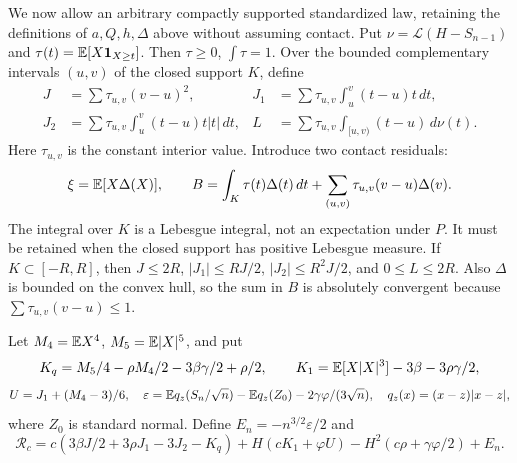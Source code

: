 We now allow an arbitrary compactly supported standardized law, retaining
the definitions of $a,Q,h,\Delta$ above without assuming contact.
Put $\nu=\mathcal L(H-S_{n-1})$ and
$\tau(t)=\mathbb E[X\mathbf1_{X\ge t}]$. Then $\tau\ge0$, $\int\tau=1$.
Over the bounded complementary intervals $(u,v)$ of the closed support
$K$, define
\begin{align*}
 J&=\sum\tau_{u,v}(v-u)^2,&
 J_1&=\sum\tau_{u,v}\int_u^v(t-u)t\,dt,\\
 J_2&=\sum\tau_{u,v}\int_u^v(t-u)t|t|\,dt,&
 L&=\sum\tau_{u,v}\int_{[u,v)}(t-u)\,d\nu(t).
\end{align*}
Here $\tau_{u,v}$ is the constant interior value. Introduce two
contact residuals:
\begin{equation}\label{v8con:residuals}
 \xi=\mathbb E[X\Delta(X)],\qquad
 B=\int_K\tau(t)\Delta(t)\,dt
       +\sum_{(u,v)}\tau_{u,v}(v-u)\Delta(v).
\end{equation}
The integral over $K$ is a Lebesgue integral, not an expectation under $P$.
It must be retained when the closed support has positive Lebesgue measure.
If $K\subset[-R,R]$, then $J\le2R$, $|J_1|\le RJ/2$,
$|J_2|\le R^2J/2$, and $0\le L\le2R$. Also $\Delta$ is bounded on
the convex hull, so the sum in $B$ is absolutely convergent because
$\sum\tau_{u,v}(v-u)\le1$.

Let $M_4=\mathbb E X^4$, $M_5=\mathbb E|X|^5$, and put
\[
 K_q=M_5/4-\rho M_4/2-3\beta\gamma/2+\rho/2,
 \qquad K_1=\mathbb E[X|X|^3]-3\beta-3\rho\gamma/2,
\]
\[
 U=J_1+(M_4-3)/6,\quad
 \varepsilon=\mathbb E q_z(S_n/\sqrt n)-\mathbb E q_z(Z_0)
                  -2\gamma\varphi/(3\sqrt n),\quad
 q_z(x)=(x-z)|x-z|,
\]
where $Z_0$ is standard normal. Define $E_n=-n^{3/2}\varepsilon/2$ and
\begin{equation}\label{v8con:R}
 \mathcal R_c=c(3\beta J/2+3\rho J_1-3J_2-K_q)
 +H(cK_1+\varphi U)-H^2(c\rho+\gamma\varphi/2)+E_n.
\end{equation}

